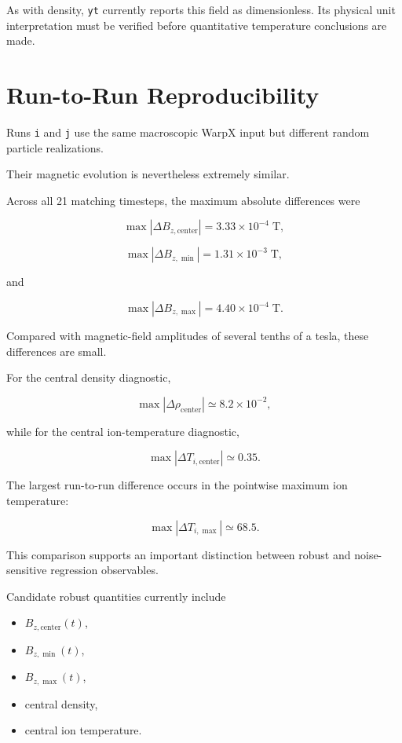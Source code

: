 \documentclass[11pt,a4paper]{article}
\begin{document}
As with density, \texttt{yt} currently reports this field as dimensionless.
Its physical unit interpretation must be verified before quantitative
temperature conclusions are made.

\section{Run-to-Run Reproducibility}

Runs \texttt{i} and \texttt{j} use the same macroscopic WarpX input but
different random particle realizations.

Their magnetic evolution is nevertheless extremely similar.

Across all 21 matching timesteps, the maximum absolute differences were

\[
\max|\Delta B_{z,\mathrm{center}}|
=
3.33\times10^{-4}\;\mathrm{T},
\]

\[
\max|\Delta B_{z,\min}|
=
1.31\times10^{-3}\;\mathrm{T},
\]

and

\[
\max|\Delta B_{z,\max}|
=
4.40\times10^{-4}\;\mathrm{T}.
\]

Compared with magnetic-field amplitudes of several tenths of a tesla, these
differences are small.

For the central density diagnostic,

\[
\max|\Delta\rho_{\mathrm{center}}|
\simeq 8.2\times10^{-2},
\]

while for the central ion-temperature diagnostic,

\[
\max|\Delta T_{i,\mathrm{center}}|
\simeq 0.35.
\]

The largest run-to-run difference occurs in the pointwise maximum ion
temperature:

\[
\max|\Delta T_{i,\max}|
\simeq68.5.
\]

This comparison supports an important distinction between robust and
noise-sensitive regression observables.

Candidate robust quantities currently include

\begin{itemize}
    \item \(B_{z,\mathrm{center}}(t)\),
    \item \(B_{z,\min}(t)\),
    \item \(B_{z,\max}(t)\),
    \item central density,
    \item central ion temperature.
\end{itemize}
\end{document}
